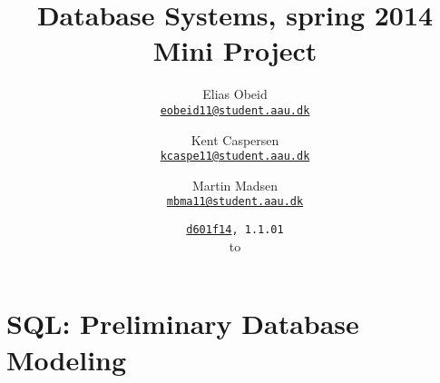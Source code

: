 \documentclass[a4paper, 12pt, twoside, article]{memoir}
\title{Database Systems, spring 2014\\Mini Project}
\date{%
  \texttt{\href{mailto:d601f14@cs.aau.dk}{d601f14}, 1.1.01}\\
  \protect\formatdate{6}{2}{2014} to \protect\formatdate{6}{2}{2014}
}
\author{%
  Elias Obeid\\
  \href{mailto:eobeid11@student.aau.dk}{\texttt{eobeid11@student.aau.dk}}
  \and
  Kent Caspersen\\
  \href{mailto:kcaspe11@student.aau.dk}{\texttt{kcaspe11@student.aau.dk}}
  \and
  Martin Madsen\\
  \href{mailto:mbma11@student.aau.dk}{\texttt{mbma11@student.aau.dk}}
}
\begin{document}
\frontmatter

\maketitle
\pagebreak

\mainmatter





\newpage
\appendix

\chapter{SQL: Preliminary Database Modeling}\label{sec:sqlPre}
\inputminted{sql}{1-06.02.14/selfStudy1db.sql}
\end{document}
